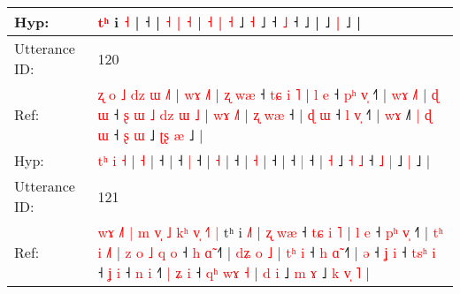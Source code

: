 \documentclass[10pt]{article}
\DeclareRobustCommand{\hl}[1]{{\textcolor{red}{#1}}}
\begin{document}
\begin{longtable}{ll}
 \\
Hyp: & \hl{}\hl{}\hl{}\hl{}\hl{}\hl{t}\hl{ʰ} i\hl{}\hl{}\hl{}\hl{}\hl{}\hl{} \hl{˧} |\hl{}\hl{}\hl{}\hl{} ˧\hl{}\hl{}\hl{}\hl{}\hl{}\hl{}\hl{} |\hl{}\hl{}\hl{}\hl{}\hl{}\hl{}\hl{}\hl{} \hl{}\hl{˧} \hl{|} \hl{}\hl{˧} \hl{|} \hl{˧} \hl{|} \hl{}\hl{˧} ˩\hl{}\hl{} \hl{}\hl{˧} ˩\hl{}\hl{}\hl{}\hl{} ˧\hl{}\hl{} \hl{˩} ˧\hl{}\hl{}\hl{}\hl{}\hl{}\hl{}\hl{}\hl{}\hl{}\hl{} ˩ |\hl{}\hl{}\hl{}\hl{} ˩\hl{}\hl{} \hl{}\hl{|} ˩\hl{} |
 \\
\midrule
Utterance ID: & 120 \\
Ref: & \hl{ʐ}\hl{ }\hl{o}\hl{ }\hl{˩}\hl{ }\hl{d}\hl{z} \hl{ɯ} \hl{˩}\hl{˥} |\hl{ }\hl{w}\hl{ɤ} \hl{˩}\hl{˥} |\hl{ }\hl{ʐ}\hl{ }\hl{w}\hl{æ} ˧\hl{ }\hl{t}\hl{ɕ}\hl{ }\hl{i}\hl{ }\hl{˥} |\hl{ }\hl{l}\hl{ }\hl{e} ˧\hl{ }\hl{p}\hl{ʰ} \hl{v}\hl{̩} ˧\hl{˥} |\hl{ }\hl{w}\hl{ɤ} \hl{˩}\hl{˥} |\hl{ }\hl{ɖ}\hl{ }\hl{ɯ} ˧\hl{ }\hl{ʂ}\hl{ }\hl{ɯ}\hl{ }\hl{˩}\hl{ }\hl{d}\hl{z}\hl{ }\hl{ɯ}\hl{ }\hl{˩} |\hl{ }\hl{w}\hl{ɤ} \hl{˩}\hl{˥} |\hl{ }\hl{ʐ}\hl{ }\hl{w}\hl{æ} ˧ |\hl{ }\hl{ɖ}\hl{ }\hl{ɯ} ˧\hl{ }\hl{l} \hl{v}\hl{̩} ˧\hl{˥} | \hl{w}\hl{ɤ} ˩\hl{˥}\hl{ }\hl{|} \hl{ɖ} \hl{ɯ} ˧ \hl{ʂ} \hl{ɯ} ˩\hl{ }\hl{ʈ}\hl{ʂ} \hl{æ} ˩ |
 \\
Hyp: & \hl{}\hl{}\hl{}\hl{}\hl{}\hl{}\hl{t}\hl{ʰ} \hl{i} \hl{}\hl{˧} |\hl{}\hl{}\hl{} \hl{}\hl{˧} |\hl{}\hl{}\hl{}\hl{}\hl{} ˧\hl{}\hl{}\hl{}\hl{}\hl{}\hl{}\hl{} |\hl{}\hl{}\hl{}\hl{} ˧\hl{}\hl{}\hl{} \hl{}\hl{|} ˧\hl{} |\hl{}\hl{}\hl{} \hl{}\hl{˧} |\hl{}\hl{}\hl{}\hl{} ˧\hl{}\hl{}\hl{}\hl{}\hl{}\hl{}\hl{}\hl{}\hl{}\hl{}\hl{}\hl{}\hl{} |\hl{}\hl{}\hl{} \hl{}\hl{˧} |\hl{}\hl{}\hl{}\hl{}\hl{} ˧ |\hl{}\hl{}\hl{}\hl{} ˧\hl{}\hl{} \hl{}\hl{|} ˧\hl{} | \hl{}\hl{˧} ˩\hl{}\hl{}\hl{} \hl{˧} \hl{˩} ˧ \hl{˩} \hl{|} ˩\hl{}\hl{}\hl{} \hl{|} ˩ |
 \\
\midrule
Utterance ID: & 121 \\
Ref: & \hl{w}\hl{ɤ}\hl{ }\hl{˩}\hl{˥}\hl{ }\hl{|}\hl{ }\hl{m}\hl{ }\hl{v}\hl{̩}\hl{ }\hl{˩}\hl{ }\hl{k}\hl{ʰ}\hl{ }\hl{v}\hl{̩}\hl{ }\hl{˧}\hl{˥}\hl{ }\hl{|}\hl{ }tʰ i \hl{˩}\hl{˥} |\hl{ }\hl{ʐ}\hl{ }\hl{w}\hl{æ} ˧\hl{ }\hl{t}\hl{ɕ}\hl{ }\hl{i}\hl{ }\hl{˥} |\hl{ }\hl{l}\hl{ }\hl{e} ˧\hl{ }\hl{p}\hl{ʰ} \hl{v}\hl{̩} ˧\hl{˥} |\hl{ }\hl{t}\hl{ʰ}\hl{ }\hl{i} \hl{˩}\hl{˥} |\hl{ }\hl{z}\hl{ }\hl{o}\hl{ }\hl{˩}\hl{ }\hl{q}\hl{ }\hl{o} ˧\hl{ }\hl{h} \hl{ɑ}\hl{̃} ˧\hl{˥} |\hl{ }\hl{d}\hl{ʑ}\hl{ }\hl{o} \hl{˩} |\hl{ }\hl{t}\hl{ʰ}\hl{ }\hl{i} ˧\hl{ }\hl{h} \hl{ɑ}\hl{̃} ˧\hl{˥} |\hl{ }\hl{ə} ˧\hl{ }\hl{ʝ} \hl{i} ˧\hl{ }\hl{t}\hl{s}\hl{ʰ} \hl{i} ˧\hl{ }\hl{ʝ} \hl{i} ˧\hl{ }\hl{n} \hl{i} ˧\hl{˥}\hl{ }\hl{|}\hl{ }\hl{ʑ} \hl{i} ˧\hl{ }\hl{q}\hl{ʰ}\hl{ }\hl{w}\hl{ɤ} \hl{˧} |\hl{ }\hl{d}\hl{ }\hl{i} ˩\hl{ }\hl{m} \hl{ɤ} ˩\hl{ }\hl{k}\hl{ }\hl{v}\hl{̩}\hl{ }\hl{˥} |

\end{longtable}
\end{document}
